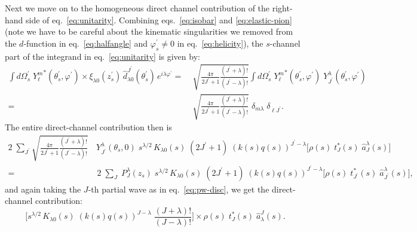 \documentclass[10pt, aps,prd,amsmath,amssymb,superscriptaddress,onecolumn,
nofootinbib,showpacs,preprintnumbers]{revtex4-1}
\begin{document}
Next we move on to the homogeneous direct channel contribution of the right-hand side of eq.~\ref{eq:unitarity}. Combining eqs.~\ref{eq:isobar} and \ref{eq:elastic-pion} (note we have to be careful about the kinematic singularities we removed from the \(d\)-function in eq.~\ref{eq:halfangle} and \(\varphi^\prime_s \not= 0\) in eq.~\ref{eq:helicity}), the \(s\)-channel part of the integrand in eq.~\ref{eq:unitarity} is given by:
  \begin{align}
      \label{eq:direct-channel-angle}
     \int d\Omega_s^\prime \; {Y^m_\ell}^*(\theta_s^\prime, \varphi^\prime) \times \xi_{\lambda0}(z_s^\prime) \, \hat{d}_{\lambda0}^{J^\prime}(\theta_s^\prime) \, e^{i\lambda \varphi^\prime} =&
     \; \sqrt{\frac{4\pi}{2J^\prime+1}\frac{(J^\prime+\lambda)!}{(J^\prime-\lambda)!}} \int d\Omega_s^\prime \; {Y^m_\ell}^*(\theta_s^\prime, \varphi^\prime) \;  Y^\lambda_{J^\prime}(\theta_s^\prime, \varphi^\prime) \nonumber \\
    =& \;  \sqrt{\frac{4\pi}{2J^\prime+1}\frac{(J^\prime+\lambda)!}{(J^\prime-\lambda)!}} \;  \delta_{m\lambda} \; \delta_{\ell J^\prime}.
  \end{align}
The entire direct-channel contribution then is
  \begin{align}
    2 \; \sum_{J^\prime} \sqrt{\frac{4\pi}{2J^\prime+1}\frac{(J^\prime+\lambda)!}{(J^\prime-\lambda)!}}& \, {Y^\lambda_{J^\prime}}(\theta_s,0) \; s^{\lambda/2} \, K_{\lambda 0}(s) \; (2J^\prime +1) \; (k(s)q(s))^{J^\prime - \lambda}
    \bigg[\rho(s) \; t^*_J(s) \; \hat{a}^\lambda_J(s) \bigg ] \nonumber \\
    =& \;  2\;  \sum_J \; P^\lambda_J(z_s) \; s^{\lambda/2} \, K_{\lambda 0}(s) \; (2J^\prime +1) \; (k(s)q(s))^{J^\prime - \lambda}
    \bigg[\rho(s) \; t^*_{J^\prime}(s) \; \hat{a}^\lambda_{J^\prime}(s) \bigg ],
  \end{align}
and again taking the \(J\)-th partial wave as in eq.~\ref{eq:pw-disc}, we get the direct-channel contribution:
  \begin{equation}
    \label{eq:pw-direct}
   \bigg[ s^{\lambda/2} \, K_{\lambda 0}(s) \; (k(s)q(s))^{J - \lambda} \; \frac{(J+\lambda)!}{(J- \lambda)!} \bigg] \times \rho(s) \; t^*_J(s) \; \hat{a}_\lambda^J(s).
  \end{equation}
\end{document}
